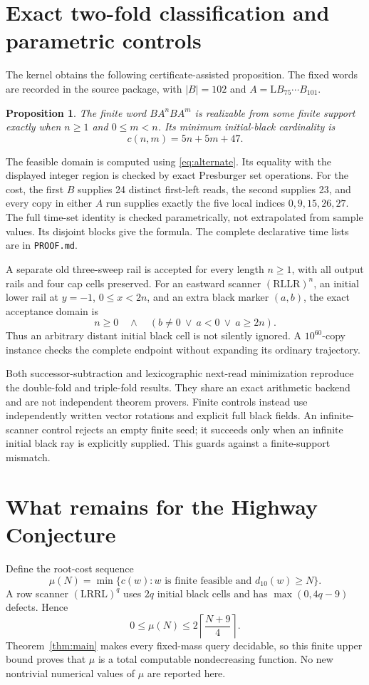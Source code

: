 \documentclass[11pt]{article}
\newtheorem{proposition}[theorem]{Proposition}
\theoremstyle{remark}\newtheorem{remark}[theorem]{Remark}
\newcommand{\Rr}{\mathrm R}\newcommand{\Ll}{\mathrm L}
\begin{document}
\section{Exact two-fold classification and parametric controls}
The kernel obtains the following certificate-assisted proposition. The fixed
words are recorded in the source package, with $|B|=102$ and $A=\Ll B_{75}\cdots
B_{101}$.
\begin{proposition}\label{prop:two}
The finite word $BA^nBA^m$ is realizable from some finite support exactly when
$n\ge1$ and $0\le m<n$. Its minimum initial-black cardinality is
\[
 c(n,m)=5n+5m+47.
\]
\end{proposition}
The feasible domain is computed using \eqref{eq:alternate}. Its equality with
the displayed integer region is checked by exact Presburger set operations.
For the cost, the first $B$ supplies 24 distinct first-left reads, the second
supplies 23, and every copy in either $A$ run supplies exactly the five local
indices $0,9,15,26,27$. The full time-set identity is checked parametrically,
not extrapolated from sample values. Its disjoint blocks give the formula.
The complete declarative time lists are in \texttt{PROOF.md}.

A separate old three-sweep rail is accepted for every length $n\ge1$, with all
output rails and four cap cells preserved. For an eastward scanner
$(\Rr\Ll\Ll\Rr)^n$, an initial lower rail at $y=-1$, $0\le x<2n$, and an
extra black marker $(a,b)$, the exact acceptance domain is
\[
 n\ge0\quad\wedge\quad(b\ne0\ \vee\ a<0\ \vee\ a\ge2n).
\]
Thus an arbitrary distant initial black cell is not silently ignored. A
$10^{60}$-copy instance checks the complete endpoint without expanding its
ordinary trajectory.

Both successor-subtraction and lexicographic next-read minimization reproduce
the double-fold and triple-fold results. They share an exact arithmetic backend
and are not independent theorem provers. Finite controls instead use independently
written vector rotations and explicit full black fields. An infinite-scanner
control rejects an empty finite seed; it succeeds only when an infinite initial
black ray is explicitly supplied. This guards against a finite-support mismatch.

\section{What remains for the Highway Conjecture}
Define the root-cost sequence
\[
 \mu(N)=\min\{c(w):w\text{ is finite feasible and }d_{10}(w)\ge N\}.
\]
A row scanner $(\Ll\Rr\Rr\Ll)^q$ uses $2q$ initial black cells and has
$\max(0,4q-9)$ defects. Hence
\[
 0\le\mu(N)\le2\left\lceil\frac{N+9}{4}\right\rceil.
\]
Theorem~\ref{thm:main} makes every fixed-mass query decidable, so this finite
upper bound proves that $\mu$ is a total computable nondecreasing function.
No new nontrivial numerical values of $\mu$ are reported here.
\end{document}
